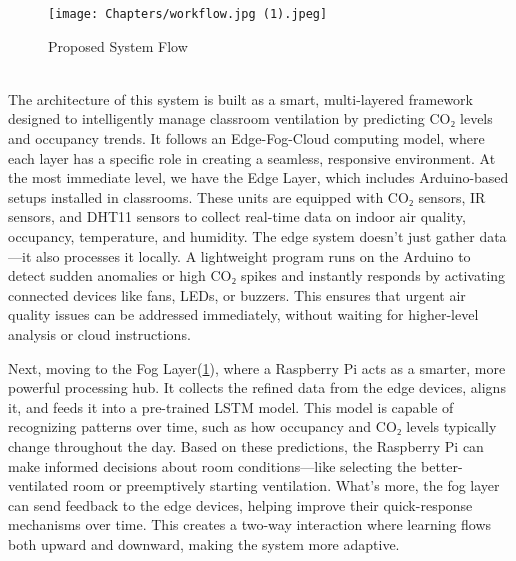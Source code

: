 \begin{figure}[h]
		\centering
	\texttt{[image: Chapters/workflow.jpg (1).jpeg]}
    \label{fig:augmentation}
		\caption{Proposed System Flow}
\end{figure}\\
The architecture of this system is built as a smart, multi-layered framework designed to intelligently manage classroom ventilation by predicting CO₂ levels and occupancy trends. It follows an Edge-Fog-Cloud computing model, where each layer has a specific role in creating a seamless, responsive environment. At the most immediate level, we have the Edge Layer, which includes Arduino-based setups installed in classrooms. These units are equipped with CO₂ sensors, IR sensors, and DHT11 sensors to collect real-time data on indoor air quality, occupancy, temperature, and humidity. The edge system doesn't just gather data—it also processes it locally. A lightweight program runs on the Arduino to detect sudden anomalies or high CO₂ spikes and instantly responds by activating connected devices like fans, LEDs, or buzzers. This ensures that urgent air quality issues can be addressed immediately, without waiting for higher-level analysis or cloud instructions.

Next, moving to the Fog Layer(\ref{fig:augmentation}), where a Raspberry Pi acts as a smarter, more powerful processing hub. It collects the refined data from the edge devices, aligns it, and feeds it into a pre-trained LSTM model. This model is capable of recognizing patterns over time, such as how occupancy and CO₂ levels typically change throughout the day. Based on these predictions, the Raspberry Pi can make informed decisions about room conditions—like selecting the better-ventilated room or preemptively starting ventilation. What's more, the fog layer can send feedback to the edge devices, helping improve their quick-response mechanisms over time. This creates a two-way interaction where learning flows both upward and downward, making the system more adaptive.

